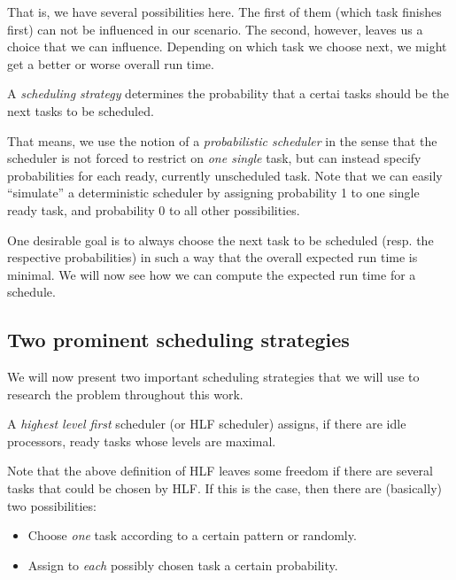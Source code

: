 That is, we have several possibilities here. The first of them (which task finishes first) can not be influenced in our scenario. The second, however, leaves us a choice that we can influence. Depending on which task we choose next, we might get a better or worse overall run time.

\begin{definition}
  A \emph{scheduling strategy} determines the probability that a certai tasks should be the next tasks to be scheduled.
\end{definition}

That means, we use the notion of a \emph{probabilistic scheduler} in the sense that the scheduler is not forced to restrict on \emph{one single} task, but can instead specify probabilities for each ready, currently unscheduled task. Note that we can easily ``simulate'' a deterministic scheduler by assigning probability 1 to one single ready task, and probability 0 to all other possibilities.

One desirable goal is to always choose the next task to be scheduled (resp. the respective probabilities) in such a way that the overall expected run time is minimal. We will now see how we can compute the expected run time for a schedule.

\subsection{Two prominent scheduling strategies}
\label{sec:intro-two-scheduling-strategies}

We will now present two important scheduling strategies that we will use to research the problem throughout this work.

\begin{definition}
  A \emph{highest level first} scheduler (or HLF scheduler) assigns, if there are idle processors, ready tasks whose levels are maximal.
\end{definition}

Note that the above definition of HLF leaves some freedom if there are several tasks that could be chosen by HLF. If this is the case, then there are (basically) two possibilities:
\begin{itemize}
\item Choose \emph{one} task according to a certain pattern or randomly.
\item Assign to \emph{each} possibly chosen task a certain probability.
\end{itemize}

